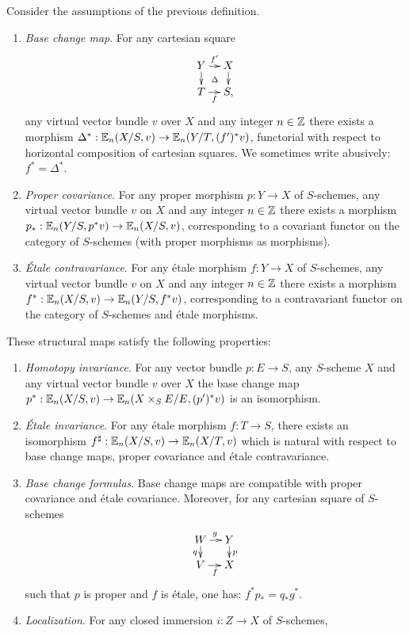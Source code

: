 \begin{prop}\label{prop:biv_functorial}
Consider the assumptions of the previous definition.
\begin{enumerate}
\item \emph{Base change map}. For any cartesian square
$$
\xymatrix@=10pt{
Y\ar[r]^-{f'}\ar[d]\ar@{}|\Delta[rd] & X\ar[d] \\
T\ar_-f[r] & S,
}
$$
any virtual vector bundle $v$ over $X$ and any integer $n\in \mathbb{Z}$
there exists a morphism $\Delta^*:\mathbb E_{n}(X/S,v) \rightarrow \mathbb E_{n}(Y/T,(f')^*v)$, functorial
with respect to horizontal composition of cartesian squares. We sometimes write abusively: $f^*=\Delta^*$.
\item \emph{Proper covariance}. For any proper morphism $p:Y \rightarrow X$ of $S$-schemes, any virtual vector bundle $v$ on $X$ and any integer $n\in\mathbb{Z}$
there exists a morphism $p_*:\mathbb E_{n}(Y/S,p^*v) \rightarrow \mathbb E_{n}(X/S,v)$,
corresponding to a covariant functor on the category of $S$-schemes (with proper morphisms as morphisms).
\item \emph{\'Etale contravariance}. For any étale morphism $f:Y \rightarrow X$ of $S$-schemes, any virtual vector bundle $v$ on $X$ and any integer $n\in\mathbb{Z}$
there exists a morphism $f^*:\mathbb E_{n}(X/S,v) \rightarrow \mathbb E_{n}(Y/S,f^*v)$,
corresponding to a contravariant functor on the category of $S$-schemes and étale morphisms.
\end{enumerate}
These structural maps satisfy the following properties:
\begin{enumerate}[resume]
\item \emph{Homotopy invariance}. For any vector bundle $p:E \rightarrow S$, any $S$-scheme $X$ and any virtual vector bundle $v$ over $X$
the base change map $p^*:\mathbb E_{n}(X/S,v) \rightarrow \mathbb E_{n}(X \times_S E/E,(p')^*v)$ is an isomorphism.
\item \emph{\'Etale invariance}. For any étale morphism $f:T \rightarrow S$,
there exists an isomorphism $f^\sharp:\mathbb E_{n}(X/S,v) \rightarrow \mathbb E_{n}(X/T,v)$ which is natural
with respect to base change maps, proper covariance and étale contravariance.
\item \emph{Base change formulas}. Base change maps are compatible with proper covariance and étale covariance.
Moreover, for any cartesian square of $S$-schemes
$$
\xymatrix@=10pt{
W\ar^g[r]\ar_q[d] & Y\ar^p[d] \\
V\ar_f[r] & X
}
$$
such that $p$ is proper and $f$ is étale, one has: $f^*p_*=q_*g^*$.
\item \emph{Localization}. For any closed immersion $i:Z \rightarrow X$ of $S$-schemes, 

\end{enumerate}
\end{prop}
